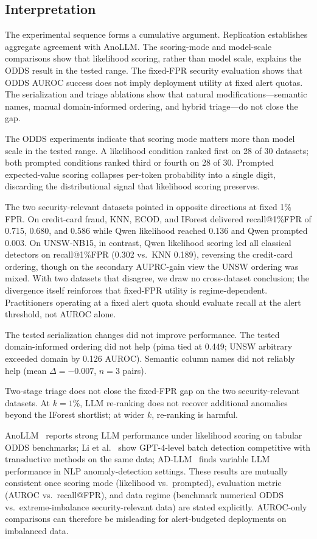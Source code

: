\documentclass[conference]{IEEEtran}
\begin{document}
\subsection{Interpretation}
The experimental sequence forms a cumulative argument. Replication establishes aggregate agreement with AnoLLM. The scoring-mode and model-scale comparisons show that likelihood scoring, rather than model scale, explains the ODDS result in the tested range. The fixed-FPR security evaluation shows that ODDS AUROC success does not imply deployment utility at fixed alert quotas. The serialization and triage ablations show that natural modifications---semantic names, manual domain-informed ordering, and hybrid triage---do not close the gap.

The ODDS experiments indicate that scoring mode matters more than model scale in the tested range.
A likelihood condition ranked first on 28 of 30 datasets; both prompted conditions ranked third or fourth on 28 of 30.
Prompted expected-value scoring collapses per-token probability into a single digit, discarding the distributional signal that likelihood scoring preserves.

The two security-relevant datasets pointed in opposite directions at fixed 1\% FPR.
On credit-card fraud, KNN, ECOD, and IForest delivered recall@1\%FPR of 0.715, 0.680, and 0.586 while Qwen likelihood reached 0.136 and Qwen prompted 0.003.
On UNSW-NB15, in contrast, Qwen likelihood scoring led all classical detectors on recall@1\%FPR (0.302 vs.\ KNN 0.189), reversing the credit-card ordering, though on the secondary AUPRC-gain view the UNSW ordering was mixed.
With two datasets that disagree, we draw no cross-dataset conclusion; the divergence itself reinforces that fixed-FPR utility is regime-dependent.
Practitioners operating at a fixed alert quota should evaluate recall at the alert threshold, not AUROC alone.

The tested serialization changes did not improve performance.
The tested domain-informed ordering did not help (pima tied at 0.449; UNSW arbitrary exceeded domain by 0.126 AUROC).
Semantic column names did not reliably help (mean $\Delta=-0.007$, $n=3$ pairs).

Two-stage triage does not close the fixed-FPR gap on the two security-relevant datasets.
At $k=1\%$, LLM re-ranking does not recover additional anomalies beyond the IForest shortlist; at wider $k$, re-ranking is harmful.

AnoLLM~\cite{tsai2025anollm} reports strong LLM performance under likelihood scoring on tabular ODDS benchmarks; Li et al.~\cite{li2024tabularllm} show GPT-4-level batch detection competitive with transductive methods on the same data; AD-LLM~\cite{yang2025adllm} finds variable LLM performance in NLP anomaly-detection settings. These results are mutually consistent once scoring mode (likelihood vs.\ prompted), evaluation metric (AUROC vs.\ recall@FPR), and data regime (benchmark numerical ODDS vs.\ extreme-imbalance security-relevant data) are stated explicitly.
AUROC-only comparisons can therefore be misleading for alert-budgeted deployments on imbalanced data.
\end{document}
